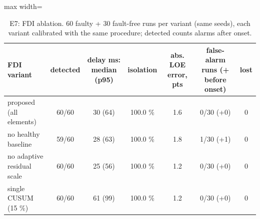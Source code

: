 \begin{table}[t]
\centering
\caption{E7: FDI ablation. 60 faulty + 30 fault-free runs per variant (same seeds), each variant calibrated with the same procedure; detected counts alarms after onset.}
\label{tab:e7}
\footnotesize
\setlength{\tabcolsep}{3pt}
\begin{adjustbox}{max width=\linewidth}
\begin{tabular}{lcccccc}
\toprule
FDI variant & detected & delay ms: median (p95) & isolation & abs. LOE error, pts & false-alarm runs (+ before onset) & lost \\
\midrule
proposed (all elements) & 60/60 & 30 (64) & 100.0 \% & 1.6 & 0/30 (+0) & 0 \\
no healthy baseline & 59/60 & 28 (63) & 100.0 \% & 1.8 & 1/30 (+1) & 0 \\
no adaptive residual scale & 60/60 & 25 (56) & 100.0 \% & 1.2 & 0/30 (+0) & 0 \\
single CUSUM (15 \%) & 60/60 & 61 (99) & 100.0 \% & 1.2 & 0/30 (+0) & 0 \\
\bottomrule
\end{tabular}
\end{adjustbox}
\end{table}
